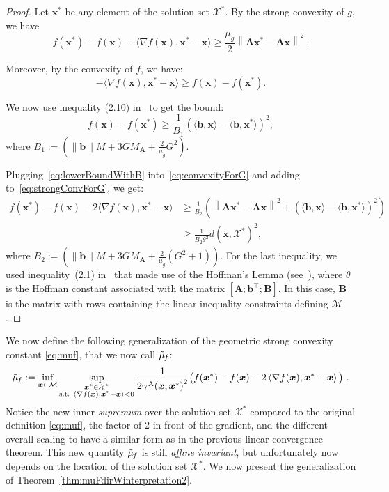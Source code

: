 \documentclass{article} %
\providecommand{\norm}[1]{\left\lVert#1\right\rVert}
\newcommand{\X}{\mathcal{X}}
\newcommand{\domain}{\mathcal{M}} %
\newcommand{\stepsize}{\gamma}
\newcommand{\away}{{\hspace{0.06em}\textnormal{\scriptsize A}}}
\newcommand{\x}{\bm{x}}
\newcommand{\innerProdCompressed}[2]{\langle #1 , #2 \rangle}
\newcommand{\A}{\bm{A}}
\newcommand{\B}{\bm{B}}
\newcommand{\bv}{\bm{b}}
\newcommand{\strongConvGeneralized}{\tilde{\mu}_{\hspace{-0.08em}f}}
\newcommand{\0}{\mathbf{0}} %
\begin{document}
\begin{proof}
Let $\x^*$ be any element of the solution set $\X^*$. By the strong convexity of $g$, we have
\begin{equation} \label{eq:strongConvForG}
f(\x^*)- f(\x)- \langle\nabla f(\x), \x^*-\x \rangle
\geq \textstyle\frac{\mu_g}{2} \norm{\A \x^* - \A \x}^2 \ .
\end{equation}

Moreover, by the convexity of $f$, we have:
\begin{equation} \label{eq:convexityForG}
- \langle\nabla f(\x), \x^*-\x \rangle
\geq f(\x) - f(\x^*) .
\end{equation}

We now use inequality (2.10) in~\citep{Beck:2015vo} to get the bound:
\begin{equation} \label{eq:lowerBoundWithB}
f(\x) - f(\x^*) \geq  \frac{1}{B_1} (\innerProdCompressed{\bv}{\x} - \innerProdCompressed{\bv}{\x^*} )^2 ,
\end{equation}
where $B_1 := ( \|\bv \| M + 3 G M_{\A} + \frac{2}{\mu_g} G^2)$.

Plugging~\eqref{eq:lowerBoundWithB} into~\eqref{eq:convexityForG} and adding to~\eqref{eq:strongConvForG}, we get:
\begin{align*} 
f(\x^*)- f(\x)- 2 \langle\nabla f(\x), \x^*-\x \rangle
&\geq \frac{1}{B_2} \left( \norm{\A \x^* - \A \x}^2  + (\innerProdCompressed{\bv}{\x} - \innerProdCompressed{\bv}{\x^*} )^2 \right) \\
&\geq \frac{1}{B_2 \theta^2} d(\x, \X^*)^2 ,
\end{align*}
where $B_2 := ( \|\bv \| M + 3 G M_{\A} + \frac{2}{\mu_g} (G^2+1))$. For the last inequality, we used 
inequality~(2.1) in~\citep{Beck:2015vo} that made use of
the Hoffman's Lemma (see~\citep[Lemma 2.2]{Beck:2015vo}),
where $\theta$ is the Hoffman constant associated with the matrix $[\A ; \bv^\top ; \B]$. In this case, $\B$ is the matrix with rows containing the linear inequality constraints defining $\domain$.
\end{proof}

We now define the following generalization of the geometric strong convexity constant \eqref{eq:muf}, that we now call $\strongConvGeneralized$:
\begin{equation}\label{eq:mufGeneralized}
  \strongConvGeneralized := \inf_{\x\in \domain} \sup_{\substack{\x^* \in \X^*\\
                        \textrm{s.t. } \left\langle \nabla f(\x), \x^*-\x \right\rangle < 0 }}
           \frac{1}{{2 \stepsize^\away(\x,\x^*)}^2}
           \big( f(\x^*)-f(\x)-2 \left\langle \nabla f(\x),  \x^*-\x \right\rangle \big) \ .
\end{equation}
Notice the new inner \emph{supremum} over the solution set $\X^*$ compared to the original definition \eqref{eq:muf}, the factor of $2$ in front of the gradient, and the different 
overall scaling to have a similar form as in the previous linear convergence theorem. 
This new quantity $\strongConvGeneralized$ is still \emph{affine invariant}, but
unfortunately now depends on the location of the solution set $\X^*$.
We now present the generalization of Theorem~\ref{thm:muFdirWinterpretation2}.
\end{document}
